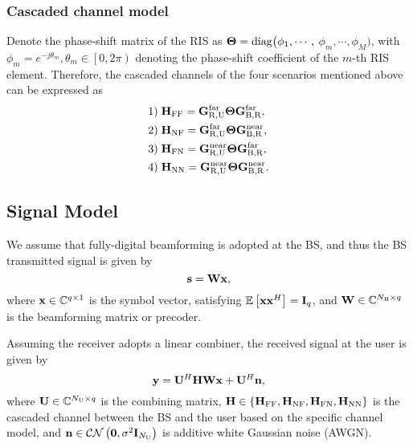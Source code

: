 \documentclass[lettersize, journal]{IEEEtran}
\begin{document}
\subsubsection{Cascaded channel model}

Denote the phase-shift matrix of the RIS as ${\bf{\Theta }} = {\rm diag} \big( \phi_1,  \cdots , $ $\phi_m , \cdots , \phi_M \big)$, with  $\phi_m = e^{-j\theta_m  }, \theta_m \in \left[ 0, 2\pi \right)$ denoting the phase-shift coefficient of the $m$-th RIS element.
Therefore, the cascaded channels of the four scenarios mentioned above can be expressed as
\begin{subequations}\label{CascadedChannel}
\begin{align}
1) \; & {\bf{H}}_{\rm{FF}} = {\bf{G}}_{{\rm{R}}, {\rm{U}}}^{\rm{far}} {\bf{\Theta }} {{\bf{G}}_{{\rm{B}}, {\rm{R}}}^{\rm{far}}}, \\
2) \; & {\bf{H}}_{\rm{NF}} = {\bf{G}}_{{\rm{R}}, {\rm{U}}}^{\rm{far}} {\bf{\Theta }} {{\bf{G}}_{{\rm{B}}, {\rm{R}}}^{\rm{near}}}, \\
3) \; & {\bf{H}}_{\rm{FN}} = {\bf{G}}_{{\rm{R}}, {\rm{U}}}^{\rm{near}} {\bf{\Theta }} {{\bf{G}}_{{\rm{B}}, {\rm{R}}}^{\rm{far}}}, \\
4) \; & {\bf{H}}_{\rm{NN}} = {\bf{G}}_{{\rm{R}}, {\rm{U}}}^{\rm{near}} {\bf{\Theta }} {{\bf{G}}_{{\rm{B}}, {\rm{R}}}^{\rm{near}}}.
\end{align}
\end{subequations}

\subsection{Signal Model}

We assume that fully-digital beamforming is adopted at the BS, and thus the BS transmitted signal is given by
\begin{equation}\label{DigitalBeamforming}
{\bf{s}} = {\bf{W}} {\bf{x}},
\end{equation}
where ${\bf{x}} \in {\mathbb{C}}^{q \times 1} $ is the symbol vector, satisfying ${\mathbb{E}}\left[ {\bf{x}} {\bf{x}}^H \right] = {\bf{I}}_{q}$, and
${\bf{W}}\in {\mathbb{C}} ^{N_{\rm{B}} \times q} $ is the beamforming matrix or precoder.

Assuming the receiver adopts a linear combiner, the received signal at the user is given by
\begin{equation}
{\bf{y}} = {\bf{U}}^H {\bf{H}} {\bf{W}} {\bf{x}} + {\bf{U}}^H{\bf{n}},
\end{equation}
where ${\bf{U}} \in {\mathbb{C}}^{N_{\rm{U}} \times q}$ is the combining matrix, ${\bf{H}} \in \left\{ {\bf{H}}_{\rm{FF}}, {\bf{H}}_{\rm{NF}}, {\bf{H}}_{\rm{FN}}, {\bf{H}}_{\rm{NN}} \right\}$ is the cascaded channel between the BS and the user based on the specific channel model, and ${\bf{n}} \in {\cal{CN}} \left( {\bf{0}}, \sigma^2{\bf{I}}_{N_{\rm{U}}} \right) $ is additive white Gaussian noise (AWGN).
\end{document}
